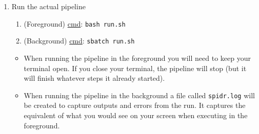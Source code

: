 \documentclass{article}
\begin{document}
\begin{enumerate}
        \item Run the actual pipeline
            \begin{enumerate}
                \item (Foreground) \underline{cmd}: \texttt{bash run.sh}
                \item (Background) \underline{cmd}: \texttt{sbatch run.sh}
            \end{enumerate}
        \begin{itemize}
            \item When running the pipeline in the foreground you will need to keep your terminal open. If you close your terminal, the pipeline will stop (but it will finish whatever steps it already started).
            \item When running the pipeline in the background a file called \texttt{spidr.log} will be created to capture outputs and errors from the run. It captures the equivalent of what you would see on your screen when executing in the foreground.
        \end{itemize}
    \end{enumerate}

    \noindent\makebox[\linewidth]{\rule{\paperwidth}{0.4pt}}
\end{document}
